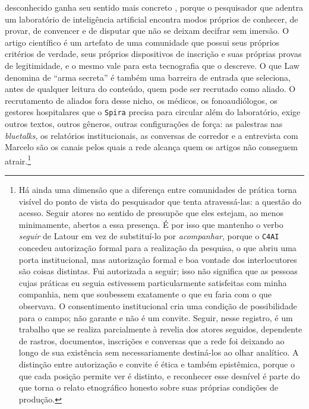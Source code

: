 desconhecido ganha seu sentido mais concreto \parencite{Latour2011CienciaEmAcao}, porque o pesquisador que adentra um laboratório de inteligência artificial encontra modos próprios de conhecer, de provar, de convencer e de disputar que não se deixam decifrar sem imersão. O artigo científico é um artefato de uma comunidade que possui seus próprios critérios de verdade, seus próprios dispositivos de inscrição e suas próprias provas de legitimidade, e o mesmo vale para esta tecnografia que o descreve. O que Law denomina de \enquote{arma secreta} é também uma barreira de entrada que seleciona, antes de qualquer leitura do conteúdo, quem pode ser recrutado como aliado. O recrutamento de aliados fora desse nicho, os médicos, os fonoaudiólogos, os gestores hospitalares que o \texttt{Spira} precisa para circular além do laboratório, exige outros textos, outros gêneros, outras configurações de força: as palestras nas \textit{bluetalks}, os relatórios institucionais, as conversas de corredor e a entrevista com Marcelo são os canais pelos quais a rede alcança quem os artigos não conseguem atrair.\footnote{Há ainda uma dimensão que a diferença entre comunidades de prática torna visível do ponto de vista do pesquisador que tenta atravessá-las: a questão do acesso. Seguir atores no sentido de \textcite{Latour2011CienciaEmAcao} pressupõe que eles estejam, ao menos minimamente, abertos a essa presença. É por isso que mantenho o verbo \textit{seguir} de Latour em vez de substituí-lo por \textit{acompanhar}, porque o \texttt{C4AI} concedeu autorização formal para a realização da pesquisa, o que abriu uma porta institucional, mas autorização formal e boa vontade dos interlocutores são coisas distintas. Fui autorizada a seguir; isso não significa que as pessoas cujas práticas eu seguia estivessem particularmente satisfeitas com minha companhia, nem que soubessem exatamente o que eu faria com o que observava. O consentimento institucional cria uma condição de possibilidade para o campo; não garante e não é um convite. Seguir, nesse registro, é um trabalho que se realiza parcialmente à revelia dos atores seguidos, dependente de rastros, documentos, inscrições e conversas que a rede foi deixando ao longo de sua existência sem necessariamente destiná-los ao olhar analítico. A distinção entre autorização e convite é ética e também epistêmica, porque o que cada posição permite ver é distinto, e reconhecer esse desnível é parte do que torna o relato etnográfico honesto sobre suas próprias condições de produção.}

